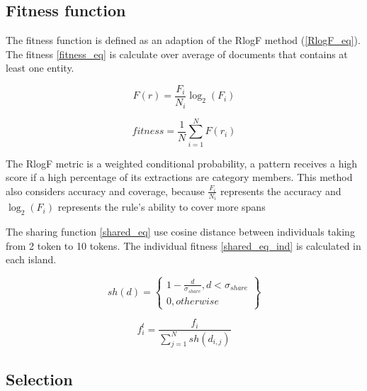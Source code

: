 \documentclass{IEEEtran}
\begin{document}
\subsection{Fitness function}

The fitness function is defined as an adaption of the
RlogF method (\ref*{RlogF_eq})\cite{seman_lex}. The fitness \ref{fitness_eq} is calculate over average of documents that contains at least one entity.

\begin{equation}
  \label{RlogF_eq}
  F(r) = \frac{F_i}{N_i} {\log_2}({F_i})
\end{equation}

\begin{equation}
  \label{fitness_eq}
  fitness = \frac{1}{N} \sum_{i=1}^{N} F(r_i)
\end{equation}

The RlogF metric is a weighted conditional probability, a pattern receives a high score if a high percentage of its extractions are category members\cite{seman_lex}. This method also considers accuracy and coverage, because $\frac{F_i}{N_i}$ represents the accuracy and ${\log_2}({F_i})$ represents the rule's ability to cover more spans \cite{tallor}

The sharing function \ref{shared_eq} use cosine distance between individuals taking from 2 token to 10 tokens. The individual fitness \ref{shared_eq_ind} is calculated in each island.

\begin{equation}
  \label{shared_eq}
  sh(d) = \left \{
  \begin{array}{l}
    1  - \frac{d}{\sigma_{share}}, d < {\sigma_{share}} \\
    0, otherwise
  \end{array}
  \right \}
\end{equation}

\begin{equation}
  \label{shared_eq_ind}
  f^t_i = \frac{f_i}{\sum_{j=1}^N sh(d_{i,j})}
\end{equation}

\subsection{Selection}
\end{document}
